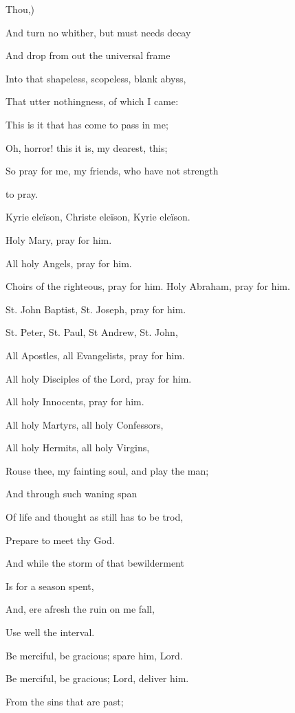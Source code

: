 Thou,)

And turn no whither, but must needs decay

And drop from out the universal frame

Into that shapeless, scopeless, blank abyss,

That utter nothingness, of which I
came:

This is it that has come to pass in me;

Oh, horror! this it is, my dearest,
this;

So pray for me, my friends, who have not strength

to pray.


Kyrie eleïson, Christe eleïson, Kyrie eleïson.

Holy Mary, pray for him.

All holy Angels, pray for him.

Choirs of the righteous, pray for him. Holy Abraham, pray for him.

St. John Baptist, St. Joseph, pray for him.

St. Peter, St. Paul, St Andrew, St. John,

All Apostles, all Evangelists, pray for him.

All holy Disciples of the Lord, pray for him.

All holy Innocents, pray for him.

All holy Martyrs, all holy Confessors,

All holy Hermits, all holy Virgins,


Rouse thee, my fainting soul, and play the man;

And through such waning span

Of life and thought as still has to be trod,

Prepare to meet thy God.

And while the storm of that bewilderment

Is for a season spent,

And, ere afresh the ruin on me fall,

Use well the interval.


Be merciful, be gracious; spare him, Lord.

Be merciful, be gracious; Lord, deliver him.

From the sins that are past;

